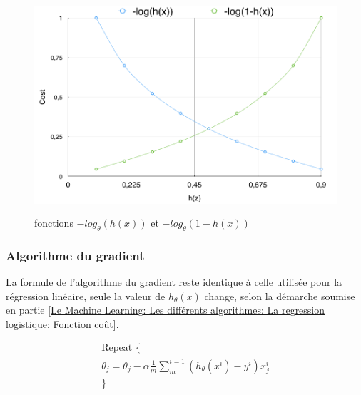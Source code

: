 \begin{figure}[h]
	\centering\includegraphics[height=8cm]{images/cost_log.png}
	\caption[fonctions $-log(h_\theta(x))$ et $-log_\theta(1-h(x))$]{fonctions $-log_\theta(h(x))$ et $-log_\theta(1-h(x))$}
	\label{fig:fonctions -log(h(x)) et -log(1-h(x))}
\end{figure}

\subsubsection{Algorithme du gradient}
\label{Le Machine Learning: Les différents algorithmes: La regression logistique: L'algorithme du gradient}
La formule de l'algorithme du gradient reste identique à celle utilisée pour la régression linéaire, seule la valeur de $h_\theta(x)$ change, selon la démarche soumise en partie \ref{Le Machine Learning: Les différents algorithmes: La regression logistique: Fonction coût}.

\begin{equation}
\begin{split}
\text{Repeat \{} \\
\theta_j = \theta_j - \alpha \frac{1}{m}\sum_{m}^{i=1}(h_\theta(x^i) - y^i)x_j^i \\
\text{\}} \\
\end{split}
\end{equation}


